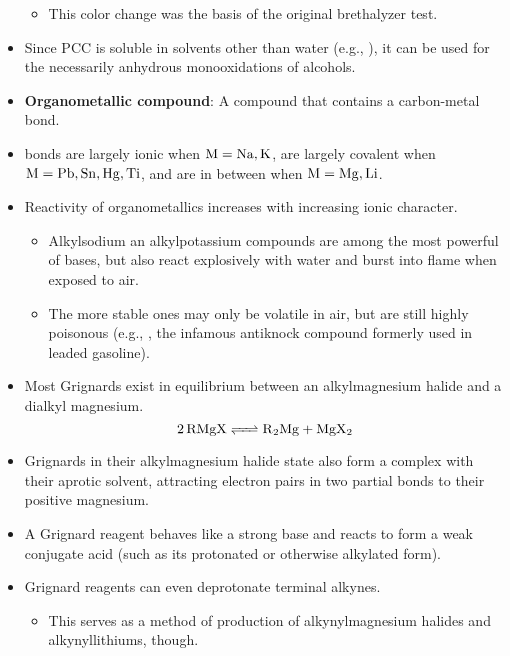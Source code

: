 \documentclass[../notes.tex]{subfiles}
\begin{document}
\begin{itemize}
    \begin{itemize}
        \item This color change was the basis of the original brethalyzer test.
    \end{itemize}
    \item Since PCC is soluble in solvents other than water (e.g., ), it can be used for the necessarily anhydrous monooxidations of alcohols.
    \item {}\textbf{Organometallic compound}: A compound that contains a carbon-metal bond.
    \item {} bonds are largely ionic when $\ce{M}=\ce{Na, K}$, are largely covalent when $\ce{M}=\ce{Pb, Sn, Hg, Ti}$, and are in between when $\ce{M}=\ce{Mg, Li}$.
    \item Reactivity of organometallics increases with increasing ionic character.
    \begin{itemize}
        \item Alkylsodium an alkylpotassium compounds are among the most powerful of bases, but also react explosively with water and burst into flame when exposed to air.
        \item The more stable ones may only be volatile in air, but are still highly poisonous (e.g., , the infamous antiknock compound formerly used in leaded gasoline).
    \end{itemize}
    \item Most Grignards exist in equilibrium between an alkylmagnesium halide and a dialkyl magnesium.
    \begin{equation*}
        \ce{2RMgX <=> R2Mg + MgX2}
    \end{equation*}
    \item Grignards in their alkylmagnesium halide state also form a complex with their aprotic solvent, attracting electron pairs in two partial bonds to their positive magnesium.
    \item A Grignard reagent behaves like a strong base and reacts to form a weak conjugate acid (such as its protonated or otherwise alkylated form).
    \item Grignard reagents can even deprotonate terminal alkynes.
    \begin{itemize}
        \item This serves as a method of production of alkynylmagnesium halides and alkynyllithiums, though.
    \end{itemize}
\end{itemize}
\end{document}
